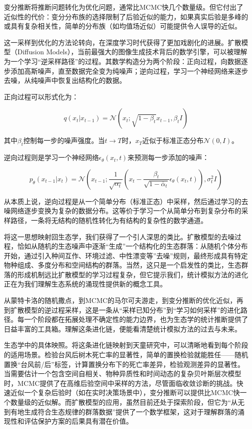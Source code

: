 \documentclass[
  twoside,12pt,fontset=none]{ctexbook}
\begin{document}
变分推断将推断问题转化为优化问题，通常比MCMC快几个数量级。但它付出了近似性的代价：变分分布族的选择限制了后验近似的能力，如果真实后验是多峰的或具有复杂相关性，简单的分布族（如均值场近似）可能提供令人误导的近似。

这一采样到优化的方法论转向，在深度学习时代获得了更加戏剧化的进展。扩散模型（Diffusion Models），当前最强大的图像生成技术背后的数学引擎，可以被理解为一个学习``逆采样路径''的过程。其数学构造分为两个阶段：正向过程，向数据逐步添加高斯噪声，直至数据完全变为纯噪声；逆向过程，学习一个神经网络来逐步去噪，从纯噪声中恢复出结构化的数据。

正向过程可以形式化为：

\[q(x_t | x_{t-1}) = \mathcal{N}(x_t; \sqrt{1-\beta_t} x_{t-1}, \beta_t I)\]

其中\(\beta_t\)控制每一步的噪声强度。当\(t \to T\)时，\(x_T\)近似于标准正态分布\(\mathcal{N}(0, I)\)。

逆向过程则是学习一个神经网络\(\epsilon_\theta(x_t, t)\)来预测每一步添加的噪声：

\[p_\theta(x_{t-1} | x_t) = \mathcal{N}(x_{t-1}; \frac{1}{\sqrt{\alpha_t}}(x_t - \frac{\beta_t}{\sqrt{1-\bar{\alpha}_t}}\epsilon_\theta(x_t, t)), \sigma_t^2 I)\]

从本质上说，逆向过程是从一个简单分布（标准正态）中采样，然后通过学习的去噪网络逐步变换为复杂的数据分布。这等价于学习一个从简单分布到复杂分布的采样路径，一条将无结构的随机性转化为有结构的复杂性的数学通道。

将这一思想映射回生态学，我们获得了一个引人深思的类比。扩散模型的去噪过程，恰如从随机的生态噪声中逐渐``生成''一个结构化的生态群落：从随机个体分布开始，通过引入种间互作、环境过滤、中性漂变等''去噪''规则，最终形成具有特定物种组成、多度分布和空间结构的群落。当然，这只是一个启发性的类比，生态群落的形成机制远比扩散模型的学习过程复杂，但它提示我们，统计模拟方法的进化正在为我们理解生态系统的涌现性提供新的概念工具。

从蒙特卡洛的随机撒点，到MCMC的马尔可夫游走，到变分推断的优化近似，再到扩散模型的逆过程采样，这是一条从``采样已知分布''到``学习如何采样''的进化路径。每一个阶段都在拓展处理不确定性的能力边界，也为生态学的统计推断提供了日益丰富的工具箱。理解这条进化链，便能看清楚统计模拟方法的过去与未来。

生态学中的具体映照。将这条进化链映射到天童研究中，可以清晰地看到每个阶段的适用场景。检验台风后树木死亡率的显著性，简单的置换检验就能胜任------随机置换``台风前/后''标签，计算置换分布下的死亡率差异，检验观测差异的显著性。当需要估计一个包含空间自相关、物种异质性和时间动态的复杂贝叶斯层次模型时，MCMC提供了在高维后验空间中采样的方法，尽管面临收敛诊断的挑战。快速近似一个复杂后验时（如在实时决策场景中），变分推断可以提供比MCMC快一个数量级的近似解。而扩散模型的应用，虽然目前还处于探索阶段，但它为``从无到有地生成符合生态规律的群落数据''提供了一个数学框架，这对于理解群落的涌现性和评估保护方案的后果具有潜在价值。
\end{document}
